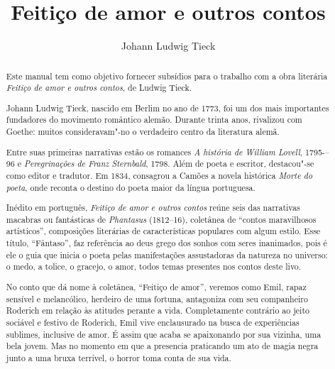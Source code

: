 \documentclass[12pt]{extarticle}
\begin{document}
\newcommand{\AutorLivro}{Johann Ludwig Tieck}
\newcommand{\TituloLivro}{Feitiço de amor e outros contos}
\newcommand{\Tema}{Ficção, mistério e fantasia}
\newcommand{\Genero}{Conto, crônica e novela}
\newcommand{\imagemCapa}{./images/PNLD0041-01.png}
\newcommand{\issnppub}{978-65-994422-0-9}
\newcommand{\issnepub}{978-65-994422-3-0}
\newcommand{\colaborador}{{Michelle Etienne Florence, Bruno Gradella e Vicente Castro}}


\title{\TituloLivro}
\author{\AutorLivro}
\def\authornotes{\colaborador}

\date{}
\maketitle


\begin{abstract}
Este manual tem como objetivo fornecer subsídios para o trabalho com a
obra literária \emph{Feitiço de amor e outros contos}, de Ludwig Tieck.

Johann Ludwig Tieck, nascido em Berlim no ano de 1773, foi um dos mais 
importantes fundadores do movimento romântico alemão. Durante trinta anos, 
rivalizou com Goethe: muitos consideravam"-no o verdadeiro centro da
literatura alemã. 

Entre suas primeiras narrativas estão os romances \emph{A história de William 
Lovell}, 1795-–96 e \emph{Peregrinações de Franz Sternbald}, 1798. Além de poeta 
e escritor, destacou"-se como editor e tradutor. Em 1834, consagrou a Camões
a novela histórica \emph{Morte do poeta}, onde reconta o destino do poeta 
maior da língua portuguesa. 

Inédito em português, \textit{Feitiço de amor e outros contos} reúne seis das 
narrativas macabras ou fantásticas de \textit{Phantasus} (1812--16), coletânea 
de ``contos maravilhosos artísticos'', composições literárias de características 
populares com algum estilo. Esse título, ``Fântaso'', faz referência ao deus grego 
dos sonhos com seres inanimados, pois é ele o guia que inicia o poeta pelas
manifestações assustadoras da natureza no universo: o medo, a tolice, o gracejo, 
o amor, todos temas presentes nos contos deste livo. 

No conto que dá nome à coletânea, ``Feitiço de amor'', veremos como Emil, rapaz
sensível e melancólico, herdeiro de uma fortuna, antagoniza com seu companheiro 
Roderich em relação às atitudes perante a vida. Completamente contrário ao jeito
sociável e festivo de Roderich, Emil vive enclausurado na busca de experiências 
sublimes, inclusive de amor. É assim que acaba se apaixonando por sua vizinha, 
uma bela jovem. Mas no momento em que a presencia praticando um ato de magia negra
junto a uma bruxa terrível, o horror toma conta de sua vida. 


\end{abstract}
\end{document}
